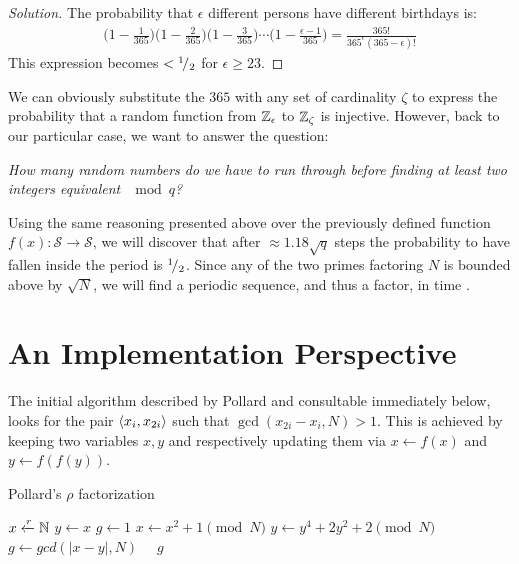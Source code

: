 \begin{proof}[Solution]
  The probability that $\epsilon$ different persons have different birthdays is:
  \begin{align*}
    \Big(1 - \frac{1}{365}\Big)
    \Big(1 - \frac{2}{365}\Big)
    \Big(1 - \frac{3}{365}\Big)
    \cdots
    \Big(1 - \frac{\epsilon -1}{365}\Big)
    =
    \frac{365!}{365^\epsilon (365-\epsilon)!}
  \end{align*}
  This expression becomes $< {}^{1}\!/_{2}$ for $\epsilon \geq 23$.
\end{proof}

We can obviously substitute the $365$ with any set of cardinality $\zeta$
to express the probability that a random function from $\mathbb{Z}_{\epsilon}$
to $\mathbb{Z}_{\zeta}$ is injective. However, back to our particular case,
we want to answer the question:

\emph{
  How many random numbers do we have to run through before finding at least
  two integers equivalent $\mod{q}$?
}


Using the same reasoning presented above over the previously defined function
$f(x): \mathcal{S} \to \mathcal{S}$, we will discover that after
$\approx 1.18 \sqrt{q}$ steps the probability to have fallen inside the period
is ${}^{1}\!/_{2}$. %
Since any of the two primes factoring $N$ is bounded above by $\sqrt{N}$, we
will find a periodic sequence, and thus a factor, in time .


\section{An Implementation Perspective}

The initial algorithm described by Pollard \cite{pollardMC} and consultable
immediately below, looks for the pair $\langle x_i, x_{2i}\rangle$ such that
$\gcd(x_{2i} - x_i, N) > 1$.  This is achieved by keeping two variables $x, y$
and respectively updating them via $x \gets f(x)$ and $y \gets f(f(y))$.

\begin{algorithm}
  \caption{Pollard's $\rho$ factorization}
  \begin{algorithmic}[1]
    \State $x \xleftarrow{r} \mathbb{N}$
    \State $y \gets x$
    \State $g \gets 1$
      \State $x \gets x^2 + 1 \pmod{N}$
      \State $y \gets y^4 + 2y^2 + 2 \pmod{N}$
      \State $g \gets gcd(|x - y|, N)$
    \EndWhile
     \Return {}
    \Else \ \ \Return $g$
    \EndIf
    \EndFunction
  \end{algorithmic}
\end{algorithm}

